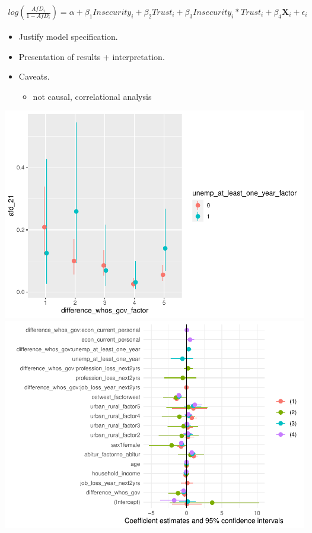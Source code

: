 \documentclass[
]{article}
\providecommand{\tightlist}{%
  \setlength{\itemsep}{0pt}\setlength{\parskip}{0pt}}
\begin{document}
\[
\begin{aligned}
log(\frac{AfD_{i}}{1-AfD_{i}}) = \alpha + \beta_{1}Insecurity_{i} +  \beta_{2}Trust_{i} + \beta_{3}Insecurity_{i}*Trust_{i} + \beta_{4}\textbf{X}_{i} + \epsilon_{i}
\end{aligned}
\]

\begin{itemize}
\item
  Justify model specification.
\item
  Presentation of results + interpretation.
\item
  Caveats.

  \begin{itemize}
  \tightlist
  \item
    not causal, correlational analysis
  \end{itemize}
\end{itemize}

\includegraphics{AVCD_Draft_Assignment_Pruned_files/figure-latex/interaction-models-lack-rep1-1.pdf}
\includegraphics{AVCD_Draft_Assignment_Pruned_files/figure-latex/interaction-models-lack-rep1-2.pdf}
\end{document}
